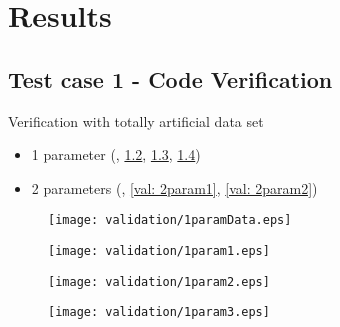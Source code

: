 \chapter{Results}
	
	
	
	
	
	
	
	
	
	
	
	
	
	
	
	
	
	\section{Test case 1 - Code Verification}
		Verification with totally artificial data set
		\begin{itemize}
			\item 1 parameter (, \ref{val: 1param1}, \ref{val: 1param2}, \ref{val: 1param3})
			\item 2 parameters (, \ref{val: 2param1}, \ref{val: 2param2})
		\end{itemize}
	
		\begin{figure}
			\centering
			\texttt{[image: validation/1paramData.eps]}
			\caption{}
			\label{val: 1paramData}
		\end{figure}
		\begin{figure}
			\centering
			\texttt{[image: validation/1param1.eps]}
			\caption{}
			\label{val: 1param1}
		\end{figure}
		\begin{figure}
			\centering
			\texttt{[image: validation/1param2.eps]}
			\caption{}
			\label{val: 1param2}
		\end{figure}
		\begin{figure}
			\centering
			\texttt{[image: validation/1param3.eps]}
			\caption{}
			\label{val: 1param3}
		\end{figure}

